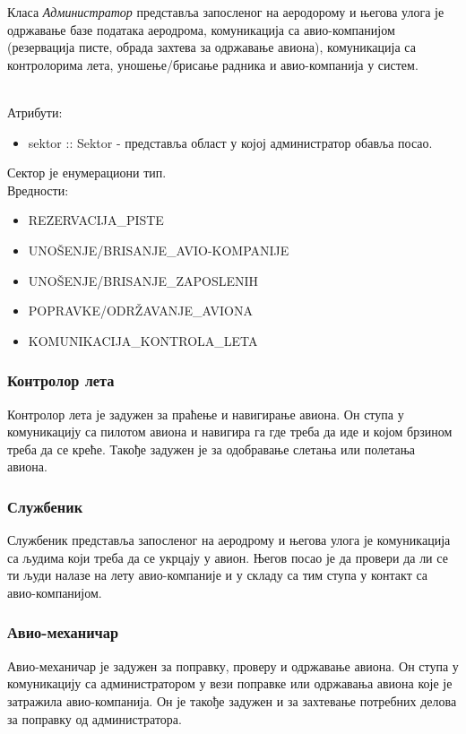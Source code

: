 \documentclass{article}
\begin{document}
Класа \textit{Администратор} представља запосленог на аеродорому и његова улога је одржавање базе 
података аеродрома, комуникација са авио-компанијом (резервација писте, обрада захтева за 
одржавање авиона), комуникација са контролорима лета, уношење/брисање радника и авио-компанија у 
систем.

\\
\vspace{20}
\hspace{-16}
Атрибути:
\begin{itemize}
    \item sektor :: Sektor - представља област у којој администратор обавља посао.
\end{itemize}

\vspace{10}
\hspace{-18}
Сектор је енумерациони тип. \\
Вредности: 
\begin{itemize}
    \item REZERVACIJA\_PISTE
    \item UNOŠENJE/BRISANJE\_AVIO-KOMPANIJE
    \item UNOŠENJE/BRISANJE\_ZAPOSLENIH
    \item POPRAVKE/ODRŽAVANJE\_AVIONA
    \item KOMUNIKACIJA\_KONTROLA\_LETA
\end{itemize}

\subsubsection{
\textbf{\large Контролор лета}}
\vspace{0.3cm}
Контролор лета је задужен за праћење и навигирање авиона. Он ступа у комуникацију са пилотом 
авиона и навигира га где треба да иде и којом брзином треба да се креће. Такође задужен је за 
одобравање слетања или полетања авиона. 

\subsubsection{
\textbf{\large Службеник}}
\vspace{0.3cm}
Службеник представља запосленог на аеродрому и његова улога је комуникација са људима који треба да се укрцају у авион. Његов посао је да провери да ли се ти људи налазе на лету авио-компаније и у складу са тим ступа у контакт са авио-компанијом.

\subsubsection{
\textbf{\large Авио-механичар}}
\vspace{0.3cm}
Авио-механичар је задужен за поправку, проверу и одржавање авиона. Он ступа у комуникацију са администратором у вези поправке или одржавања авиона које је затражила авио-компанија. Он је такође задужен и за захтевање потребних делова за поправку од администратора.
\end{document}
